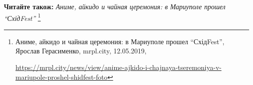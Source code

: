 \textbf{Читайте також:} \emph{Аниме, айкидо и чайная церемония: в Мариуполе прошел \enquote{СхідFest}}%
\footnote{Аниме, айкидо и чайная церемония: в Мариуполе прошел \enquote{СхідFest}, Ярослав Герасименко, mrpl.city, 12.05.2019, \par%
\url{https://mrpl.city/news/view/anime-ajkido-i-chajnaya-tseremoniya-v-mariupole-proshel-shidfest-foto}
}
